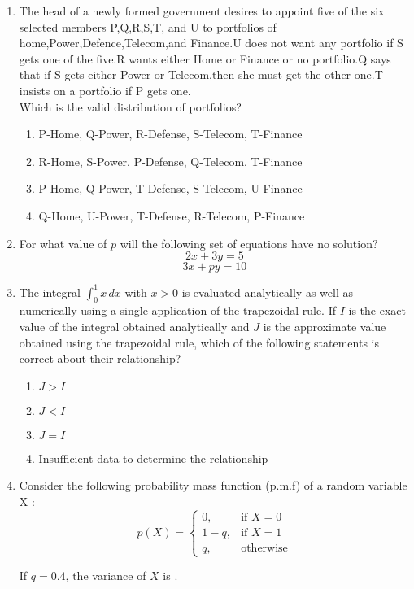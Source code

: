 \documentclass[journal]{IEEEtran}
\begin{document}
\begin{enumerate}
 \item The head of a newly formed government desires to appoint five of the six selected members P,Q,R,S,T, and U to portfolios of home,Power,Defence,Telecom,and Finance.U does not want any portfolio if S gets one of the five.R wants either Home or Finance or no portfolio.Q says that if S gets either Power or Telecom,then she must get the other one.T insists on a portfolio if P gets one.\\
 
 
 Which is the valid distribution of portfolios?
    \begin{enumerate}
        \item P-Home, Q-Power, R-Defense, S-Telecom, T-Finance
        \item R-Home, S-Power, P-Defense, Q-Telecom, T-Finance
        \item P-Home, Q-Power, T-Defense, S-Telecom, U-Finance
        \item Q-Home, U-Power, T-Defense, R-Telecom, P-Finance
    \end{enumerate}

    \item For what value of $p$ will the following set of equations have no solution?
\[
    2x + 3y = 5
\]
\[
    3x + py = 10
\]

    \item The integral $\int_0^1 x \, dx$ with $x > 0$ is evaluated analytically as well as numerically using a single application of the trapezoidal rule. If $I$ is the exact value of the integral obtained analytically and $J$ is the approximate value obtained using the trapezoidal rule, which of the following statements is correct about their relationship?
    \begin{enumerate}
        \item $J > I$
        \item $J < I$
        \item $J = I$
        \item Insufficient data to determine the relationship
    \end{enumerate}
    
    \item Consider the following probability mass function (p.m.f) of a random variable X :
\[
    p(X) =
    \begin{cases}
        0, & \text{if } X = 0 \\
        1 - q, & \text{if } X = 1 \\
        q, & \text{otherwise}
    \end{cases}
    \]

    If $q = 0.4$, the variance of $X$ is \underline{\hspace{1cm}}.
    
   

\end{enumerate}
\end{document}
